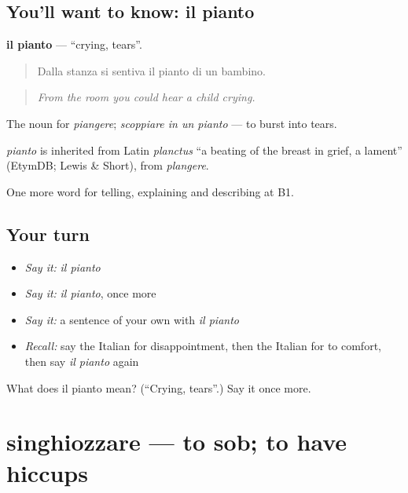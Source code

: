 \subsection*{You'll want to know: il pianto}
\textbf{il pianto} — \textquotedblleft{}crying, tears\textquotedblright{}.

\begin{quote}
Dalla stanza si sentiva il pianto di un bambino.
\end{quote}

\begin{quote}
\emph{From the room you could hear a child crying.}
\end{quote}

The noun for \emph{piangere}; \emph{scoppiare in un pianto} — to burst into tears.

\begin{cousinweb}
\emph{pianto} is inherited from Latin \emph{planctus} \textquotedblleft{}a beating of the breast in grief, a lament\textquotedblright{} (EtymDB; Lewis \& Short), from \emph{plangere}.
\end{cousinweb}

\begin{grammarlens}[title={What you've built}]
One more word for telling, explaining and describing at B1.
\end{grammarlens}

\subsection*{Your turn}
\begin{itemize}
\raggedright
  \item \emph{Say it:} \emph{il pianto}
  \item \emph{Say it:} \emph{il pianto}, once more
  \item \emph{Say it:} a sentence of your own with \emph{il pianto}
  \item \emph{Recall:} say the Italian for disappointment, then the Italian for to comfort, then say \emph{il pianto} again
\end{itemize}

\begin{tcolorbox}[breakable,colback=teal!4,colframe=teal!35!black,title={Before you move on}]
What does il pianto mean? (\textquotedblleft{}Crying, tears\textquotedblright{}.) Say it once more.
\end{tcolorbox}
\section[singhiozzare]{singhiozzare — to sob; to have hiccups}

